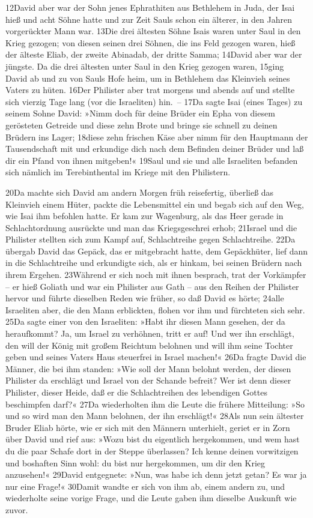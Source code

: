 12David aber war der Sohn jenes Ephrathiten aus Bethlehem in Juda, der
Isai hieß und acht Söhne hatte und zur Zeit Sauls schon ein älterer, in
den Jahren vorgerückter Mann war. 13Die drei ältesten Söhne Isais waren
unter Saul in den Krieg gezogen; von diesen seinen drei Söhnen, die ins
Feld gezogen waren, hieß der älteste Eliab, der zweite Abinadab, der
dritte Samma; 14David aber war der jüngste. Da die drei ältesten unter
Saul in den Krieg gezogen waren, 15ging David ab und zu von Sauls Hofe
heim, um in Bethlehem das Kleinvieh seines Vaters zu hüten. 16Der
Philister aber trat morgens und abends auf und stellte sich vierzig Tage
lang (vor die Israeliten) hin.~-- 17Da sagte Isai (eines Tages) zu
seinem Sohne David: »Nimm doch für deine Brüder ein Epha von diesem
gerösteten Getreide und diese zehn Brote und bringe sie schnell zu
deinen Brüdern ins Lager; 18diese zehn frischen Käse aber nimm für den
Hauptmann der Tausendschaft mit und erkundige dich nach dem Befinden
deiner Brüder und laß dir ein Pfand von ihnen mitgeben!« 19Saul und sie
und alle Israeliten befanden sich nämlich im Terebinthental im Kriege
mit den Philistern.

20Da machte sich David am andern Morgen früh reisefertig, überließ das
Kleinvieh einem Hüter, packte die Lebensmittel ein und begab sich auf
den Weg, wie Isai ihm befohlen hatte. Er kam zur Wagenburg, als das Heer
gerade in Schlachtordnung ausrückte und man das Kriegsgeschrei erhob;
21Israel und die Philister stellten sich zum Kampf auf, Schlachtreihe
gegen Schlachtreihe. 22Da übergab David das Gepäck, das er mitgebracht
hatte, dem Gepäckhüter, lief dann in die Schlachtreihe und erkundigte
sich, als er hinkam, bei seinen Brüdern nach ihrem Ergehen. 23Während er
sich noch mit ihnen besprach, trat der Vorkämpfer -- er hieß Goliath und
war ein Philister aus Gath -- aus den Reihen der Philister hervor und
führte dieselben Reden wie früher, so daß David es hörte; 24alle
Israeliten aber, die den Mann erblickten, flohen vor ihm und fürchteten
sich sehr. 25Da sagte einer von den Israeliten: »Habt ihr diesen Mann
gesehen, der da heraufkommt? Ja, um Israel zu verhöhnen, tritt er auf!
Und wer ihn erschlägt, den will der König mit großem Reichtum belohnen
und will ihm seine Tochter geben und seines Vaters Haus steuerfrei in
Israel machen!« 26Da fragte David die Männer, die bei ihm standen: »Wie
soll der Mann belohnt werden, der diesen Philister da erschlägt und
Israel von der Schande befreit? Wer ist denn dieser Philister, dieser
Heide, daß er die Schlachtreihen des lebendigen Gottes beschimpfen
darf?« 27Da wiederholten ihm die Leute die frühere Mitteilung: »So und
so wird man den Mann belohnen, der ihn erschlägt!« 28Als nun sein
ältester Bruder Eliab hörte, wie er sich mit den Männern unterhielt,
geriet er in Zorn über David und rief aus: »Wozu bist du eigentlich
hergekommen, und wem hast du die paar Schafe dort in der Steppe
überlassen? Ich kenne deinen vorwitzigen und boshaften Sinn wohl: du
bist nur hergekommen, um dir den Krieg anzusehen!« 29David entgegnete:
»Nun, was habe ich denn jetzt getan? Es war ja nur eine Frage!« 30Damit
wandte er sich von ihm ab, einem andern zu, und wiederholte seine vorige
Frage, und die Leute gaben ihm dieselbe Auskunft wie zuvor.


